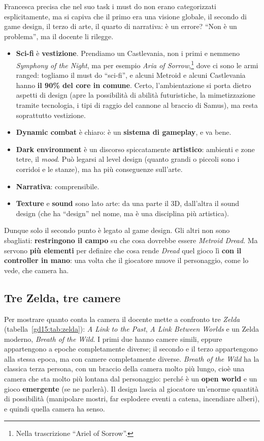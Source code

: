 Francesca precisa che nel suo task i must do non erano categorizzati
esplicitamente, ma si capiva che il primo era una visione globale, il
secondo di game design, il terzo di arte, il quarto di narrativa: è un
errore? ``Non è un problema'', ma il docente li rilegge.
\begin{itemize}
  \item \textbf{Sci-fi} è \textbf{vestizione}. Prendiamo un Castlevania,
        non i primi e nemmeno \emph{Symphony of the Night}, ma per esempio
        \emph{Aria of Sorrow},\footnote{Nella trascrizione ``Ariel of
        Sorrow''.} dove ci sono le armi ranged: togliamo il must do
        ``sci-fi'', e alcuni Metroid e alcuni Castlevania hanno
        \textbf{il 90\% del core in comune}. Certo, l'ambientazione si porta
        dietro aspetti di design (apre la possibilità di abilità
        futuristiche, la mimetizzazione tramite tecnologia, i tipi di raggio
        del cannone al braccio di Samus), ma resta soprattutto vestizione.
  \item \textbf{Dynamic combat} è chiaro: è un \textbf{sistema di
        gameplay}, e va bene.
  \item \textbf{Dark environment} è un discorso spiccatamente
        \textbf{artistico}: ambienti e zone tetre, il \emph{mood}. Può
        legarsi al level design (quanto grandi o piccoli sono i corridoi e
        le stanze), ma ha più conseguenze sull'arte.
  \item \textbf{Narrativa}: comprensibile.
  \item \textbf{Texture} e \textbf{sound} sono lato arte: da una parte il
        3D, dall'altra il sound design (che ha ``design'' nel nome, ma è una
        disciplina più artistica).
\end{itemize}
Dunque solo il secondo punto è legato al game design. Gli altri non sono
sbagliati: \textbf{restringono il campo} su che cosa dovrebbe essere
\emph{Metroid Dread}. Ma servono \textbf{più elementi} per definire che cosa
rende \emph{Dread} quel gioco lì \textbf{con il controller in mano}: una
volta che il giocatore muove il personaggio, come lo vede, che camera ha.

\subsection{Tre Zelda, tre camere}

Per mostrare quanto conta la camera il docente mette a confronto tre
\emph{Zelda} (tabella~\ref{gd15:tab:zelda}): \emph{A Link to the Past},
\emph{A Link Between Worlds} e un Zelda moderno, \emph{Breath of the Wild}.
I primi due hanno camere simili, eppure appartengono a epoche completamente
diverse; il secondo e il terzo appartengono alla stessa epoca, ma con camere
completamente diverse. \emph{Breath of the Wild} ha la classica terza
persona, con un braccio della camera molto più lungo, cioè una camera che
sta molto più lontana dal personaggio: perché è un \textbf{open world} e un
gioco \textbf{emergente} (se ne parlerà). Il design lascia al giocatore
un'enorme quantità di possibilità (manipolare mostri, far esplodere eventi a
catena, incendiare alberi), e quindi quella camera ha senso.

